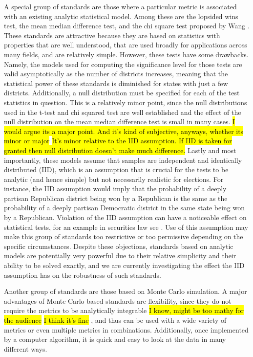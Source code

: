\documentclass[preprint,12pt]{article}
\newcommand{\CM}[2][green]{ {\sethlcolor{#1} \hl{#2}} }
\newcommand{\KB}[2][cyan]{ {\sethlcolor{#1} \hl{#2}} }
\begin{document}
A special group of standards are those where a particular metric is associated with an existing analytic statistical model.
Among these are the lopsided wins test, the mean median difference test, and the chi square test proposed by Wang \cite{Wang__,Wang_2016_10.1089/elj.2016.0387}.
These standards are attractive because they are based on statistics with properties that are well understood, that are used broadly for applications across many fields, and are relatively simple.
However, these tests have some drawbacks.
Namely, the models used for computing the significance level for those tests are valid asymptotically as the number of districts increases, meaning that the statistical power of these standards is diminished for states with just a few districts.
Additionally, a null distribution must be specified for each of the test statistics in question. 
This is a relatively minor point, since the null distributions used in the t-test and chi squared test are well established and the effect of the null distribution on the mean median difference test is small in many cases. \cite{Cabilio_1996_10.2307/3315744,Zheng_2010_}
\KB{I would argue its a major point.   And it's kind of subjective, anyways, whether its minor or major}
\CM{It's minor relative to the IID assumption. If IID is taken for granted then null distribution doesn't make much difference.}
Lastly and most importantly, these models assume that samples are independent and identically distributed (IID), which is an assumption that is crucial for the tests to be analytic (and hence simple) but not necessarily realistic for elections.
For instance, the IID assumption would imply that the probability of a deeply partisan Republican district being won by a Republican is the same as the probability of a deeply partisan Democratic district in the same state being won by a Republican.
Violation of the IID assumption can have a noticeable effect on statistical tests, for an example in securities law see \cite{Gel_2009_10.1093/lpr/mgp008}. 
Use of this assumption may make this group of standards too restrictive or too permissive depending on the specific circumstances.
Despite these objections, standards based on analytic models are potentially very powerful due to their relative simplicity and their ability to be solved exactly, and we are currently investigating the effect the IID assumption has on the robustness of such standards.

Another group of standards are those based on Monte Carlo simulation.
A major advantages of Monte Carlo based standards are flexibility, since they do not require the metrics to be analytically integrable \KB{I know, might be too mathy for the audience}\CM{I think it's fine}, and thus can be used with a wide variety of metrics or even multiple metrics in combinations.
Additionally, once implemented by a computer algorithm, it is quick and easy to look at the data in many different ways.
\end{document}
